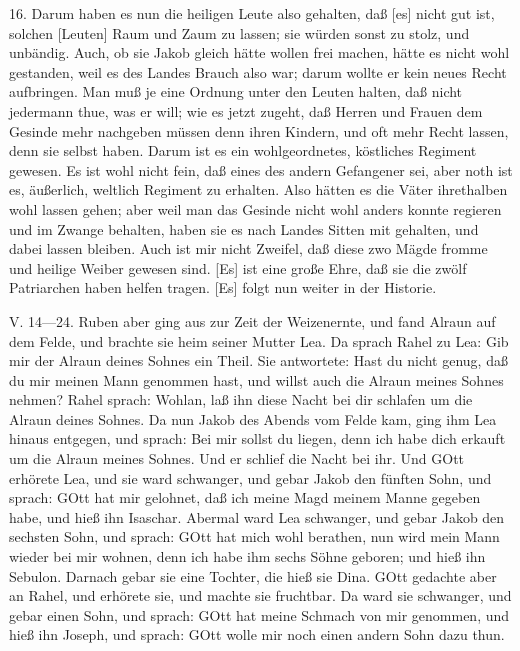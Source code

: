 16. Darum haben es nun die heiligen Leute also gehalten, daß [es] nicht gut ist, solchen [Leuten] Raum und Zaum zu lassen; sie würden sonst zu stolz, und unbändig. Auch, ob sie Jakob gleich hätte wollen frei machen, hätte es nicht wohl gestanden, weil es des Landes Brauch also war; darum wollte er kein neues Recht aufbringen. Man muß je eine Ordnung unter den Leuten halten, daß nicht jedermann thue, was er will; wie es jetzt zugeht, daß Herren und Frauen dem Gesinde mehr nachgeben müssen denn ihren Kindern, und oft mehr Recht lassen, denn sie selbst haben. Darum ist es ein wohlgeordnetes, köstliches Regiment gewesen. Es ist wohl nicht fein, daß eines des andern Gefangener sei, aber noth ist es, äußerlich, weltlich Regiment zu erhalten. Also hätten es die Väter ihrethalben wohl lassen gehen; aber weil man das Gesinde nicht wohl anders konnte regieren und im Zwange behalten, haben sie es nach Landes Sitten mit gehalten, und dabei lassen bleiben. Auch ist mir nicht Zweifel, daß diese zwo Mägde fromme und heilige Weiber gewesen sind. [Es] ist eine große Ehre, daß sie die zwölf Patriarchen haben helfen tragen. [Es] folgt nun weiter in der Historie.

\begin{schriftzitat}
V. 14—24. Ruben aber ging aus zur Zeit der Weizenernte, und fand Alraun auf dem Felde, und brachte sie heim seiner Mutter Lea. Da sprach Rahel zu Lea: Gib mir der Alraun deines Sohnes ein Theil. Sie antwortete: Hast du nicht genug, daß du mir meinen Mann genommen hast, und willst auch die Alraun meines Sohnes nehmen? Rahel sprach: Wohlan, laß ihn diese Nacht bei dir schlafen um die Alraun deines Sohnes. Da nun Jakob des Abends vom Felde kam, ging ihm Lea hinaus entgegen, und sprach: Bei mir sollst du liegen, denn ich habe dich erkauft um die Alraun meines Sohnes. Und er schlief die Nacht bei ihr. Und GOtt erhörete Lea, und sie ward schwanger, und gebar Jakob den fünften Sohn, und sprach: GOtt hat mir gelohnet, daß ich meine Magd meinem Manne gegeben habe, und hieß ihn Isaschar. Abermal ward Lea schwanger, und gebar Jakob den sechsten Sohn, und sprach: GOtt hat mich wohl berathen, nun wird mein Mann wieder bei mir wohnen, denn ich habe ihm sechs Söhne geboren; und hieß ihn Sebulon. Darnach gebar sie eine Tochter, die hieß sie Dina. GOtt gedachte aber an Rahel, und erhörete sie, und machte sie fruchtbar. Da ward sie schwanger, und gebar einen Sohn, und sprach: GOtt hat meine Schmach von mir genommen, und hieß ihn Joseph, und sprach: GOtt wolle mir noch einen andern Sohn dazu thun.
\end{schriftzitat}

